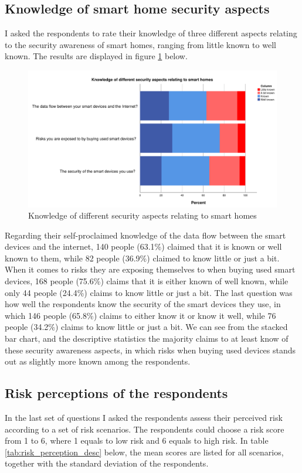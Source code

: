 \subsection{Knowledge of smart home security aspects}
I asked the respondents to rate their knowledge of three different aspects relating to the security awareness of smart homes, ranging from little known to well known. The results are displayed in figure \ref{fig:knowledge_security} below. 
\begin{figure}[!h]
    \centering
    \includegraphics[scale=0.45]{figures/diagrams/knowledge_security.pdf}
    \caption{Knowledge of different security aspects relating to smart homes}
    \label{fig:knowledge_security}
\end{figure}
Regarding their self-proclaimed knowledge of the data flow between the smart devices and the internet, 140 people (63.1\%) claimed that it is known or well known to them, while 82 people (36.9\%) claimed to know little or just a bit.
When it comes to risks they are exposing themselves to when buying used smart devices, 168 people (75.6\%) claims that it is either known of well known, while only 44 people (24.4\%) claims to know little or just a bit. 
The last question was how well the respondents know the security of the smart devices they use, in which 146 people (65.8\%) claims to either know it or know it well, while 76 people (34.2\%) claims to know little or just a bit. 
We can see from the stacked bar chart, and the descriptive statistics the majority claims to at least know of these security awareness aspects, in which risks when buying used devices stands out as slightly more known among the respondents. 

\subsection{Risk perceptions of the respondents}
\label{subsec:risk_perception}
In the last set of questions I asked the respondents assess their perceived risk according to a set of risk scenarios. The respondents could choose a risk score from 1 to 6, where 1 equals to low risk and 6 equals to high risk. In table \ref{tab:risk_perception_desc} below, the mean scores are listed for all scenarios, together with the standard deviation of the respondents. 

